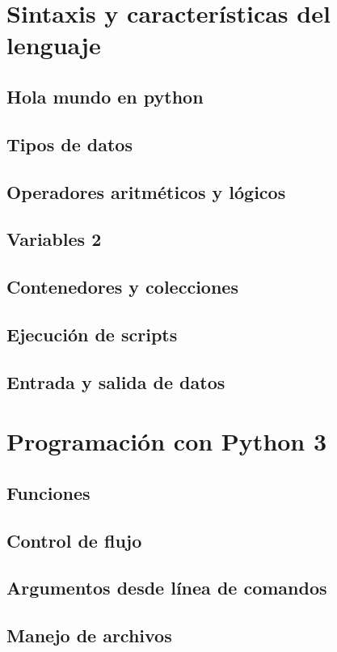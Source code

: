 \documentclass[10pt]{beamer}
\begin{document}
\section{Sintaxis y características del lenguaje}
\subsection{Hola mundo en python}
\subsection{Tipos de datos}
\subsection{Operadores aritméticos y lógicos}
\subsection{Variables 2}
\subsection{Contenedores y colecciones}
\subsection{Ejecución de scripts}
\subsection{Entrada y salida de datos}

\section{Programación con Python 3}
\subsection{Funciones}
\subsection{Control de flujo}
\subsection{Argumentos desde línea de comandos}
\subsection{Manejo de archivos}
\end{document}
